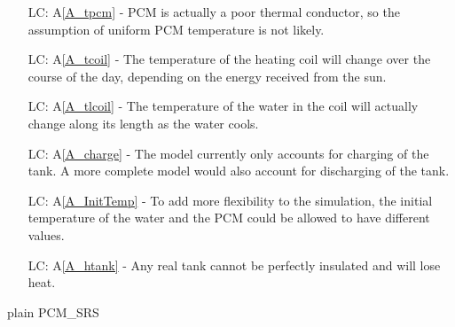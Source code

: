 \documentclass[12pt]{article}
\newcommand{\aref}[1]{A\ref{#1}}
\newcounter{lcnum} %
\begin{document}
\noindent \begin{itemize}

\item[LC\refstepcounter{lcnum}\thelcnum\label{LC_tpcm}:]\aref{A_tpcm} - PCM is
  actually a poor thermal conductor, so the assumption of uniform PCM
  temperature is not likely.

\item[LC\refstepcounter{lcnum}\thelcnum \label{LC_tcoil}:]\aref{A_tcoil} - The
  temperature of the heating coil will change over the course of the day,
  depending on the energy received from the sun.

\item[LC\refstepcounter{lcnum}\thelcnum \label{LC_tlcoil}:]\aref{A_tlcoil} - The
  temperature of the water in the coil will actually change along its length as
  the water cools.

\item[LC\refstepcounter{lcnum}\thelcnum \label{LC_charge}:]\aref{A_charge} - The
  model currently only accounts for charging of the tank.  A more complete model
  would also account for discharging of the tank.

\item[LC\refstepcounter{lcnum}\thelcnum \label{LC_InitTemp}:]\aref{A_InitTemp} - To
  add more flexibility to the simulation, the initial temperature of the water
  and the PCM could be allowed to have different values.

\item[LC\refstepcounter{lcnum}\thelcnum \label{LC_htank}:]\aref{A_htank} - Any
  real tank cannot be perfectly insulated and will lose heat.

\end{itemize}

 {plain}
 {PCM_SRS}
\end{document}
